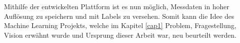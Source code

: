Mithilfe der entwickelten Plattform ist es nun möglich, Messdaten in hoher Auflösung zu speichern
und mit Labels zu versehen.
Somit kann die Idee des Machine Learning Projekts, welche im Kapitel \ref{cap1} Problem, Fragestellung, Vision erwähnt wurde und Ursprung dieser
Arbeit war, neu beurteilt werden.

